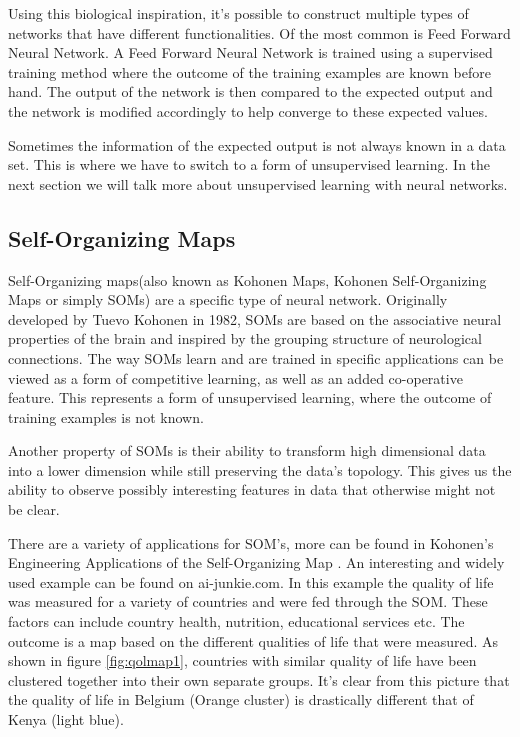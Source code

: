 \documentclass{IEEEtran}
\begin{document}
 Using this biological inspiration, it's possible to construct multiple types of networks that have different functionalities. Of the most common is Feed Forward Neural Network. A Feed Forward Neural Network is trained using a supervised training method where the outcome of the training examples are known before hand. The output of the network is then compared to the expected output and the network is modified accordingly to help converge to these expected values.
 
 Sometimes the information of the expected output is not always known in a data set. This is where we have to switch to a form of unsupervised learning. In the next section we will talk more about unsupervised learning with neural networks.

\subsection{Self-Organizing Maps}
Self-Organizing maps(also known as Kohonen Maps, Kohonen Self-Organizing Maps or simply SOMs) are a specific type of neural network. Originally developed by Tuevo Kohonen in 1982, SOMs are based on the associative neural properties of the brain and inspired by the grouping structure of neurological connections. The way SOMs learn and are trained in specific applications can be viewed as a form of competitive learning, as well as an added co-operative feature. This represents a form of unsupervised learning, where the outcome of training examples is not known.\cite{thesom}

	Another property of SOMs is their ability to transform high dimensional data into a lower dimension while still preserving the data's topology. This gives us the ability to observe possibly interesting features in data that otherwise might not be clear.\cite{somvismethods}
	
	There are a variety of applications for SOM's, more can be found in Kohonen's Engineering Applications of the Self-Organizing Map \cite{eng_app_of_soms}. An interesting and widely used example can be found on ai-junkie.com\cite{aijunkie}. In this example the quality of life was measured for a variety of countries and were fed through the SOM. These factors can include country health, nutrition, educational services etc. The outcome is a map based on the different qualities of life that were measured. As shown in figure \ref{fig:qolmap1}, countries with similar quality of life have been clustered together into their own separate groups. It's clear from this picture that the quality of life in Belgium (Orange cluster) is drastically different that of Kenya (light blue).
	
\end{document}
